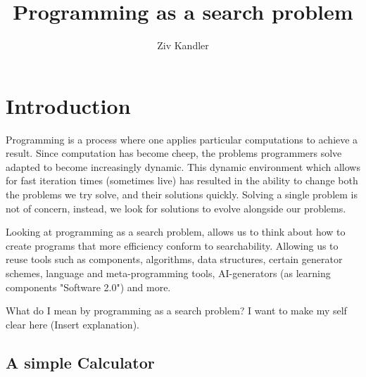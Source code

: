 \documentclass[a4paper]{article}
\title{\Huge{Programming as a search problem}}
\author{Ziv Kandler}
\begin{document}
\section{Introduction}
Programming is a process where one applies particular computations to achieve a result.
Since computation has become cheep, the problems programmers solve adapted to become 
increasingly dynamic. This dynamic environment which allows for fast iteration times 
(sometimes live) has resulted in the ability to change both the problems we try solve, 
and their solutions quickly. Solving a single problem is not of concern, instead, we 
look for solutions to evolve alongside our problems.

Looking at programming as a search problem, allows us to think about how to create 
programs that more efficiency conform to searchability. Allowing us to reuse tools 
such as components, algorithms, data structures, certain generator schemes, language
and meta-programming tools, AI-generators (as learning components "Software 2.0") 
and more. 

What do I mean by programming as a search problem? I want to make my self clear here 
(Insert explanation).  

\subsection{A simple Calculator}
\end{document}
